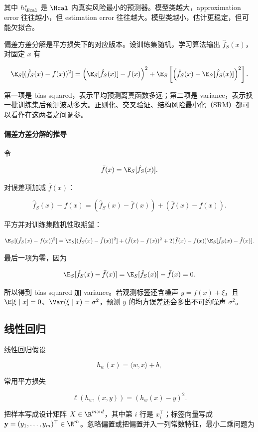 其中 \(h^*_{\Hcal}\) 是 \(\Hcal\) 内真实风险最小的预测器。模型类越大，approximation error 往往越小，但 estimation error 往往越大。模型类越小，估计更稳定，但可能欠拟合。

偏差方差分解是平方损失下的对应版本。设训练集随机，学习算法输出 \(\hat f_S(x)\)，对固定 \(x\) 有

\[
  \E_S[(\hat f_S(x)-f(x))^2]
  =
  \left(\E_S[\hat f_S(x)]-f(x)\right)^2
  +
  \E_S\left[
    \left(\hat f_S(x)-\E_S[\hat f_S(x)]\right)^2
  \right].
\]

第一项是 bias squared，表示平均预测离真函数多远；第二项是 variance，表示换一批训练集后预测波动多大。正则化、交叉验证、结构风险最小化（SRM）都可以看作在这两者之间调参。

\paragraph{偏差方差分解的推导}

令

\[
  \bar f(x)=\E_S[\hat f_S(x)].
\]

对误差项加减 \(\bar f(x)\)：

\[
  \hat f_S(x)-f(x)
  =
  \left(\hat f_S(x)-\bar f(x)\right)
  +
  \left(\bar f(x)-f(x)\right).
\]

平方并对训练集随机性取期望：

\[
  \E_S[(\hat f_S(x)-f(x))^2]
  =
  \E_S[(\hat f_S(x)-\bar f(x))^2]
  +
  (\bar f(x)-f(x))^2
  +
  2(\bar f(x)-f(x))
  \E_S[\hat f_S(x)-\bar f(x)].
\]

最后一项为零，因为

\[
  \E_S[\hat f_S(x)-\bar f(x)]
  =
  \E_S[\hat f_S(x)]-\bar f(x)
  =
  0.
\]

所以得到 bias squared 加 variance。若观测标签还含噪声 \(y=f(x)+\xi\)，且 \(\E[\xi\mid x]=0\)、\(\Var(\xi\mid x)=\sigma^2\)，预测 \(y\) 的均方误差还会多出不可约噪声 \(\sigma^2\)。

\subsection{线性回归}

线性回归假设

\[
  h_w(x)=\langle w,x\rangle+b,
\]

常用平方损失

\[
  \ell(h_w,(x,y))=(h_w(x)-y)^2.
\]

把样本写成设计矩阵 \(X\in\R^{m\times d}\)，其中第 \(i\) 行是 \(x_i^\top\)；标签向量写成 \(\mathbf{y}=(y_1,\ldots,y_m)^\top\in\R^m\)。忽略偏置或把偏置并入一列常数特征，最小二乘问题为

